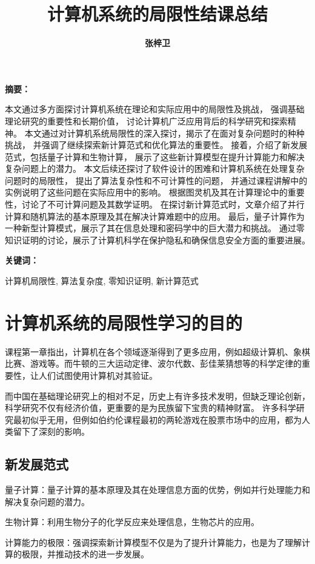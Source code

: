 \documentclass[UTF-8,a4paper,9pt]{article}
\title{\heiti\fontsize{18}{7}\textbf{计算机系统的局限性结课总结}}
\author{\kaishu\fontsize{13.5}{7}\textbf{张梓卫} \\\smallskip \fontsize{7.5}{7} \selectfont{（10235101526\ 软件工程学院\ 软件工程专业）}}
\date{}
\newenvironment{abstractZH}{
    \noindent \textbf{摘要：}
}{
    \vspace{2em}
}
\newenvironment{keywordsZH}{
  \noindent \textbf{关键词：}
}{
  \vspace{2em}
}
\begin{document}
\maketitle

\begin{abstractZH}
  本文通过多方面探讨计算机系统在理论和实际应用中的局限性及挑战，
  强调基础理论研究的重要性和长期价值，
  讨论计算机广泛应用背后的科学研究和探索精神。
  本文通过对计算机系统局限性的深入探讨，揭示了在面对复杂问题时的种种挑战，
  并强调了继续探索新计算范式和优化算法的重要性。 ​
  接着，介绍了新发展范式，包括量子计算和生物计算，
  展示了这些新计算模型在提升计算能力和解决复杂问题上的潜力。
  本文后续还探讨了软件设计的困难和计算机系统在处理复杂问题时的局限性，
  提出了算法复杂性和不可计算性的问题，
  并通过课程讲解中的实例说明了这些问题在实际应用中的影响。
  根据图灵机及其在计算理论中的重要性，讨论了不可计算问题及其数学证明。
  在探讨新计算范式时，文章介绍了并行计算和随机算法的基本原理及其在解决计算难题中的应用。
  最后，量子计算作为一种新型计算模式，展示了其在信息处理和密码学中的巨大潜力和挑战。
  通过零知识证明的讨论，展示了计算机科学在保护隐私和确保信息安全方面的重要进展。
\end{abstractZH}

\begin{keywordsZH}
  计算机局限性, 算法复杂度, 零知识证明, 新计算范式
\end{keywordsZH}

\section{计算机系统的局限性学习的目的}
课程第一章指出，计算机在各个领域逐渐得到了更多应用，例如超级计算机、象棋比赛、游戏等。而牛顿的三大运动定律、波尔代数、彭佳莱猜想等的科学定律的重要性，让人们试图使用计算机对其验证。

而中国在基础理论研究上的相对不足，历史上有许多技术发明，但缺乏理论创新，
科学研究不仅有经济价值，更重要的是为民族留下宝贵的精神财富。
许多科学研究最初似乎无用，但例如伯约伦课程最初的两轮游戏在股票市场中的应用，都为人类留下了深刻的影响。

\subsection{新发展范式}
量子计算：量子计算的基本原理及其在处理信息方面的优势，例如并行处理能力和解决复杂问题的潜力。

生物计算：利用生物分子的化学反应来处理信息，生物芯片的应用。

计算能力的极限：强调探索新计算模型不仅是为了提升计算能力，也是为了理解计算的极限，并推动技术的进一步发展。
\end{document}
